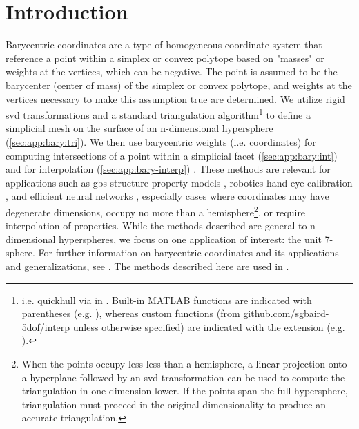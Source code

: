 \documentclass[final,12pt]{elsarticle}
\begin{document}
\section{Introduction}
Barycentric coordinates are a type of homogeneous coordinate system that reference a \outpt{} point within a simplex \cite{langerSphericalBarycentricCoordinates2006} or convex polytope \cite{floaterGeneralizedBarycentricCoordinates2015,meyerGeneralizedBarycentricCoordinates2002,langerSphericalBarycentricCoordinates2006} based on "masses" or weights at the vertices, which can be negative. The \outpt{} point is assumed to be the barycenter (center of mass) of the simplex or convex polytope, and weights at the vertices necessary to make this assumption true are determined. We utilize rigid \gls{svd} transformations and a standard triangulation algorithm\footnote{i.e. quickhull \cite{barberQuickhullAlgorithmConvex1996} via  in . Built-in MATLAB functions are indicated with parentheses (e.g. ), whereas custom functions (from \url{github.com/sgbaird-5dof/interp} unless otherwise specified) are indicated with the  extension (e.g. ). } to define a simplicial mesh on the surface of an n-dimensional hypersphere (\cref{sec:app:bary:tri}). We then use barycentric weights (i.e. coordinates) for computing intersections of a point within a simplicial facet (\cref{sec:app:bary:int}) and for interpolation (\cref{sec:app:bary-interp}) \cite{langerSphericalBarycentricCoordinates2006}. These methods are relevant for applications such as \glspl{gb} structure-property models \cite{chesserLearningGrainBoundary2020}, robotics hand-eye calibration \cite{wuHandEyeCalibration4D2020}, and efficient neural networks \cite{wuDeepOctonionNetworks2020}, especially cases where coordinates may have degenerate dimensions, occupy no more than a hemisphere\footnote{When the points occupy less less than a hemisphere, a linear projection onto a hyperplane followed by an \gls{svd} transformation can be used to compute the triangulation in one dimension lower. If the points span the full hypersphere, triangulation must proceed in the original dimensionality to produce an accurate triangulation. }, or require interpolation of properties. While the methods described are general to n-dimensional hyperspheres, we focus on one application of interest: the unit 7-sphere. For further information on barycentric coordinates and its applications and generalizations, see \cite{anisimovSubdividingBarycentricCoordinates2016,budninskiyPowerCoordinatesGeometric2016,dyerBarycentricCoordinateNeighbourhoods2016,floaterGeneralizedBarycentricCoordinates2015,floaterInjectivityWachspressMean2010,hormannDiscretizingWachspressKernels2017,hormannMaximumEntropyCoordinates2008,langerHigherOrderBarycentric2008,langerSphericalBarycentricCoordinates2006,leiNewCoordinateSystem2020,meyerGeneralizedBarycentricCoordinates2002,peixotoVectorFieldReconstructions2014,pihajokiBarycentricInterpolationRiemannian2019,rustamovBarycentricCoordinatesSurfaces2010,skalaRobustBarycentricCoordinates2013,taoFastNumericalSolver2019,warrenBarycentricCoordinatesConvex2007}. The methods described here are used in \citet{bairdFiveDegreeofFreedomProperty2021a}.
\end{document}
